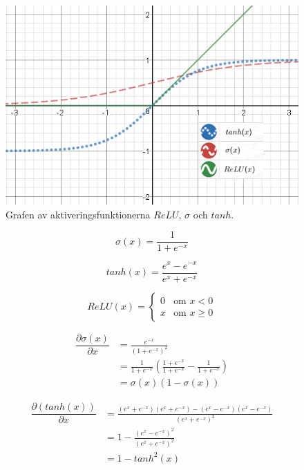 \documentclass[a4paper,11pt,twoside]{article}
\newcommand*{\pd}[2]{\ensuremath{\dfrac{\partial #1}{\partial #2}}}
\begin{document}
\begin{figure}[h]\label{aktiveringsfunktion}
	\centering
  		\includegraphics[scale=0.8]{activationfunction.png}
  	\caption{Grafen av aktiveringsfunktionerna $ReLU$, $\sigma$ och $tanh$.}
\end{figure}


\begin{equation}
\sigma(x) = \frac{1}{1+e^{-x}}
\end{equation}

\begin{equation}
tanh(x) = \frac{e^x-e^{-x}}{e^x+e^{-x}}
\end{equation}

\begin{equation}
ReLU(x) = \begin{cases} 
			0 & \mbox{om } x < 0 \\ 
			x & \mbox{om } x \geq 0 
		\end{cases}
\end{equation}

\begin{equation}
\begin{split}
\pd{\sigma(x)}{x} 	& = \frac{e^{-x}}{(1+e^{-x})^2} \\
					& = \frac{1}{1+e^{-x}}(\frac{1+e^{-x}}{1+e^{-x}}-\frac{1}{1+e^{-x}})\\
			 		& = \sigma(x)(1-\sigma(x))
\end{split}
\end{equation}

\begin{equation}
\begin{split}
\pd{(tanh(x))}{x} 	& = \frac{(e^x+e^{-x})(e^x+e^{-x})-(e^x-e^{-x})(e^x-e^{-x})}{(e^x+e^{-x})^2} \\
					& = 1 - \frac{(e^x-e^{-x})^2}{(e^x+e^{-x})^2} \\
			 		& = 1 - {tanh}^2(x)
\end{split}
\end{equation}
\end{document}
